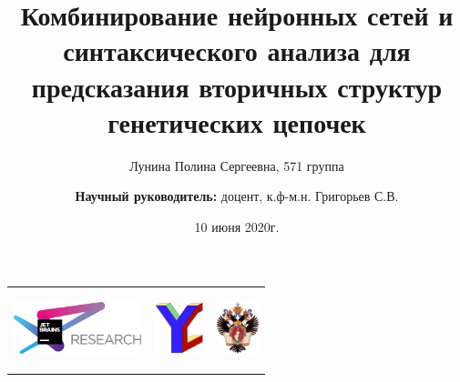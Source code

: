 \documentclass{beamer}
\title[СА + НС]{Комбинирование нейронных сетей и синтаксического анализа для предсказания вторичных структур генетических цепочек}
\institute[СПбГУ]{
Санкт-Петербургский государственный университет \\
Кафедра системного программирования }
\author[Лунина Полина]{Лунина Полина Сергеевна, 571 группа \\
  \and  
    {\bfseries Научный руководитель:} доцент, к.ф-м.н. Григорьев С.В.}
\date{10 июня 2020г.}
\begin{document}
{
\begin{frame}[fragile]
  \begin{tabular}{p{2.0cm} p{7.5cm} p{1cm}}
   \begin{center}
      \includegraphics[height=1.5cm]{pics/jetbrainsResearch.pdf}
    \end{center}
    &
    \begin{center}
      \includegraphics[height=1.5cm]{pics/YC_logo.pdf}
    \end{center}
    &
    \begin{center}
      \includegraphics[height=1.5cm]{pics/SPbGU_Logo.png}
    \end{center}
  \end{tabular}
  \titlepage
\end{frame}
}
\end{document}
